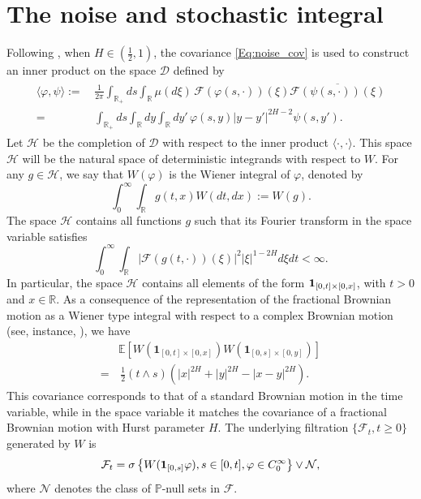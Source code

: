\documentclass[11pt,reqno]{amsart}
\numberwithin{equation}{section}
\newcommand{\E}{\mathbb E}
\def\R{\mathbb{R}}
\newcommand{\1}{{\bf 1}}
\newcommand{\2}{{\bf 2}}
\begin{document}
 \section{The noise and stochastic integral} 
 Following \cite{D99, DQ}, when $H\in (\frac12,1)$,  the covariance \eqref{Eq:noise_cov} is used to construct an inner product on the space $\mathcal D$ defined by 
\begin{align}
\begin{aligned}\label{Eq:noise_cov2}
 \langle \varphi, \psi\rangle := & \, \frac{1}{2\pi}\int_{\R_+} ds \int_\R \mu(d\xi)\, \mathscr{F}(\varphi(s, \cdot))(\xi) \overline{\mathscr{F}(\psi(s, \cdot))(\xi)}\\
  =  & \, \int_{\R_+} ds \int_\R dy \int_\R dy' \, \varphi(s, y) |y-y'|^{2H-2} \psi(s, y').
\end{aligned}
\end{align} 
 Let $\mathcal H$ be the completion of $\mathcal D$ with respect to the inner product $\langle \cdot, \cdot\rangle$. This space $\mathcal H$ will be the natural space of deterministic integrands with respect to $W$.  For any $g\in \mathcal H$, we say that $W(\varphi)$ is the Wiener integral of $\varphi$, denoted by 
$$
\int_0^{\infty}\int_{\mathbb R} g(t, x) W(dt, dx):= W(g).
$$
The space $\mathcal H$ contains all functions $g$ such that its Fourier transform in the space variable satisfies 
$$
\int_{0}^{\infty}   \int_\R     \left| \mathscr{F}(g(t, \cdot))(\xi) \right|^2    |\xi|^{1-2H} d\xi dt <\infty. 
$$
In particular, the space $\mathcal H$ contains all elements of the form ${\bf 1}_{[0,t]\times [0,x]}$, with $t>0$ and $x\in \mathbb R$. As a consequence of the representation   of the fractional Brownian  motion as a Wiener type integral with respect to a complex Brownian motion (see, instance, \cite[p. 257]{PT2000}), we have  
  \begin{align*}
& \E\left[W\left(\mathbf{1}_{[0,t]\times [0,x]}\right) W\left(\mathbf{1}_{[0,s]\times [0,y]}\right)\right] \\
= & \, \frac{1}{2} (t \wedge s) \left(|x|^{2H} + |y|^{2H} - |x-y|^{2H} \right).
\end{align*}
    This covariance corresponds to that of a standard Brownian motion in the time variable, while in the space variable it matches the covariance of a fractional Brownian motion with Hurst parameter  $H$.  The underlying filtration $\{\mathcal F_t, t\ge0\}$ generated by $W$ is 
\begin{align}\label{eq sigma filed}
\mathcal F_t=\sigma\left\{W({\bf 1}_{[0,s]} \varphi), s\in [0, t], \varphi\in  C_0^{\infty}\right\} \vee \mathcal N, 
\end{align}
 where $\mathcal N$ denotes the  class of  $\mathbb P$-null sets in $\mathcal F$. 
 
\end{document}
